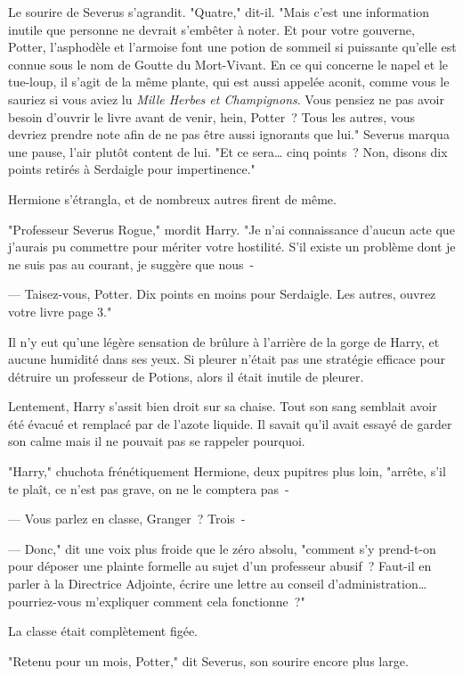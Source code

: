 Le sourire de Severus s'agrandit. "Quatre," dit-il. "Mais c'est une information inutile que personne ne devrait s'embêter à noter. Et pour votre gouverne, Potter, l'asphodèle et l'armoise font une potion de sommeil si puissante qu'elle est connue sous le nom de Goutte du Mort-Vivant. En ce qui concerne le napel et le tue-loup, il s'agit de la même plante, qui est aussi appelée aconit, comme vous le sauriez si vous aviez lu \emph{Mille Herbes et Champignons}. Vous pensiez ne pas avoir besoin d'ouvrir le livre avant de venir, hein, Potter~? Tous les autres, vous devriez prendre note afin de ne pas être aussi ignorants que lui." Severus marqua une pause, l'air plutôt content de lui. "Et ce sera… cinq points~? Non, disons dix points retirés à Serdaigle pour impertinence."

Hermione s'étrangla, et de nombreux autres firent de même.

"Professeur Severus Rogue," mordit Harry. "Je n'ai connaissance d'aucun acte que j'aurais pu commettre pour mériter votre hostilité. S'il existe un problème dont je ne suis pas au courant, je suggère que nous~-

--- Taisez-vous, Potter. Dix points en moins pour Serdaigle. Les autres, ouvrez votre livre page 3."

Il n'y eut qu'une légère sensation de brûlure à l'arrière de la gorge de Harry, et aucune humidité dans ses yeux. Si pleurer n'était pas une stratégie efficace pour détruire un professeur de Potions, alors il était inutile de pleurer.

Lentement, Harry s'assit bien droit sur sa chaise. Tout son sang semblait avoir été évacué et remplacé par de l'azote liquide. Il savait qu'il avait essayé de garder son calme mais il ne pouvait pas se rappeler pourquoi.

"Harry," chuchota frénétiquement Hermione, deux pupitres plus loin, "arrête, s'il te plaît, ce n'est pas grave, on ne le comptera pas~-

--- Vous parlez en classe, Granger~? Trois~-

--- Donc," dit une voix plus froide que le zéro absolu, "comment s'y prend-t-on pour déposer une plainte formelle au sujet d'un professeur abusif~? Faut-il en parler à la Directrice Adjointe, écrire une lettre au conseil d'administration… pourriez-vous m'expliquer comment cela fonctionne~?"

La classe était complètement figée.

"Retenu pour un mois, Potter," dit Severus, son sourire encore plus large.


